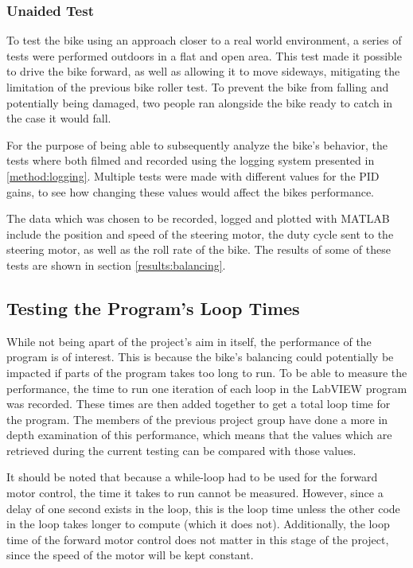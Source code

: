 \subsubsection{Unaided Test} \label{method:unaidedTest}

To test the bike using an approach closer to a real world environment, a series of tests were performed outdoors in a flat and open area. This test made it possible to drive the bike forward, as well as allowing it to move sideways, mitigating the limitation of the previous bike roller test. To prevent the bike from falling and potentially being damaged, two people ran alongside the bike ready to catch in the case it would fall.

For the purpose of being able to subsequently analyze the bike's behavior, the tests where both filmed and recorded using the logging system presented in \ref{method:logging}. Multiple tests were made with different values for the PID gains, to see how changing these values would affect the bikes performance. 

The data which was chosen to be recorded, logged and plotted with MATLAB include the position and speed of the steering motor, the duty cycle sent to the steering motor, as well as the roll rate of the bike. The results of some of these tests are shown in section \ref{results:balancing}.

\subsection{Testing the Program's Loop Times} \label{method:loopTimes}

While not being apart of the project's aim in itself, the performance of the program is of interest. This is because the bike's balancing could potentially be impacted if parts of the program takes too long to run. To be able to measure the performance, the time to run one iteration of each loop in the LabVIEW program was recorded. These times are then added together to get a total loop time for the program. The members of the previous project group have done a more in depth examination of this performance, which means that the values which are retrieved during the current testing can be compared with those values.

It should be noted that because a while-loop had to be used for the forward motor control, the time it takes to run cannot be measured. However, since a delay of one second exists in the loop, this is the loop time unless the other code in the loop takes longer to compute (which it does not). Additionally, the loop time of the forward motor control does not matter in this stage of the project, since the speed of the motor will be kept constant.